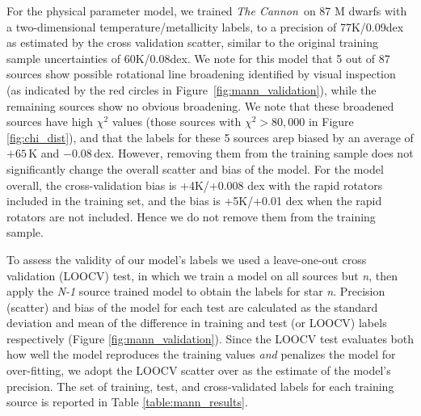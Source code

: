 \documentclass[twocolumn]{aastex62}
\newcommand{\thecannon}{\textsl{The Cannon}}
\begin{document}
For the physical parameter model, we trained \thecannon\ on 87 M dwarfs with a two-dimensional temperature/metallicity labels, to a precision of 77K/0.09dex as estimated by the cross validation scatter, similar to the original training sample uncertainties of 60K/0.08dex. We note for this model that 5 out of 87 sources show possible rotational line broadening identified by visual inspection (as indicated by the red circles in Figure~\ref{fig:mann_validation}), while the remaining sources show no obvious broadening. We note that these broadened sources have high $\chi^2$ values (those sources with $\chi^2 > 80,000$ in Figure \ref{fig:chi_dist}), and that the labels for these 5 sources arep biased by an average of $+65\,$K and $-0.08\,$dex. However, removing them from the training sample does not significantly change the overall scatter and bias of the model. For the model overall, the cross-validation bias is +4K/+0.008 dex with the rapid rotators included in the training set, and the bias is +5K/+0.01 dex when the rapid rotators are not included. Hence we do not remove them from the training sample.

To assess the validity of our model's labels we used a leave-one-out cross validation (LOOCV) test, in which we train a model on all sources but \emph{n}, then apply the \emph{N-1} source trained model to obtain the labels for star \emph{n}. Precision (scatter) and bias of the model for each test are calculated as the standard deviation and mean of the difference in training and test (or LOOCV) labels respectively (Figure \ref{fig:mann_validation}). Since the LOOCV test evaluates both how well the model reproduces the training values \emph{and} penalizes the model for over-fitting, we adopt the LOOCV scatter over as the estimate of the model's precision. The set of training, test, and cross-validated labels for each training source is reported in Table \ref{table:mann_results}.
\end{document}
